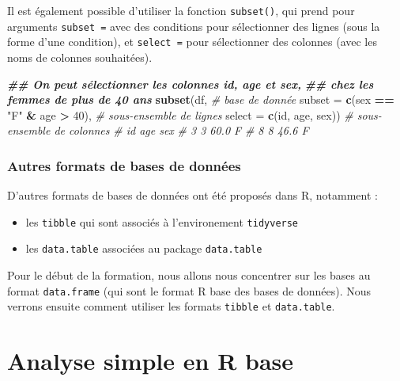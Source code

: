 \documentclass[
]{book}
\newenvironment{Shaded}{\begin{snugshade}}{\end{snugshade}}
\newcommand{\AttributeTok}[1]{\textcolor[rgb]{0.13,0.29,0.53}{#1}}
\newcommand{\CommentTok}[1]{\textcolor[rgb]{0.56,0.35,0.01}{\textit{#1}}}
\newcommand{\DecValTok}[1]{\textcolor[rgb]{0.00,0.00,0.81}{#1}}
\newcommand{\DocumentationTok}[1]{\textcolor[rgb]{0.56,0.35,0.01}{\textbf{\textit{#1}}}}
\newcommand{\FunctionTok}[1]{\textcolor[rgb]{0.13,0.29,0.53}{\textbf{#1}}}
\newcommand{\NormalTok}[1]{#1}
\newcommand{\SpecialCharTok}[1]{\textcolor[rgb]{0.81,0.36,0.00}{\textbf{#1}}}
\newcommand{\StringTok}[1]{\textcolor[rgb]{0.31,0.60,0.02}{#1}}
\providecommand{\tightlist}{%
  \setlength{\itemsep}{0pt}\setlength{\parskip}{0pt}}
\begin{document}
Il est également possible d'utiliser la fonction \texttt{subset()}, qui prend pour arguments \texttt{subset\ =} avec des conditions pour sélectionner des lignes (sous la forme d'une condition), et \texttt{select\ =} pour sélectionner des colonnes (avec les noms de colonnes souhaitées).

\begin{Shaded}
\begin{Highlighting}[]
\DocumentationTok{\#\# On peut sélectionner les colonnes id, age et sex, }
\DocumentationTok{\#\# chez les femmes de plus de 40 ans}
\FunctionTok{subset}\NormalTok{(df, }\CommentTok{\# base de donnée}
       \AttributeTok{subset =} \FunctionTok{c}\NormalTok{(sex }\SpecialCharTok{==} \StringTok{"F"} \SpecialCharTok{\&}\NormalTok{ age }\SpecialCharTok{\textgreater{}} \DecValTok{40}\NormalTok{), }\CommentTok{\# sous{-}ensemble de lignes }
       \AttributeTok{select =} \FunctionTok{c}\NormalTok{(id, age, sex)) }\CommentTok{\# sous{-}ensemble de colonnes}
\CommentTok{\#   id  age sex}
\CommentTok{\# 3  3 60.0   F}
\CommentTok{\# 8  8 46.6   F}
\end{Highlighting}
\end{Shaded}

\subsection{Autres formats de bases de données}\label{autres-formats-de-bases-de-donnuxe9es}

D'autres formats de bases de données ont été proposés dans R, notamment :

\begin{itemize}
\tightlist
\item
  les \texttt{tibble} qui sont associés à l'environement \texttt{tidyverse}
\item
  les \texttt{data.table} associées au package \texttt{data.table}
\end{itemize}

Pour le début de la formation, nous allons nous concentrer sur les bases au format \texttt{data.frame} (qui sont le format R base des bases de données). Nous verrons ensuite comment utiliser les formats \texttt{tibble} et \texttt{data.table}.

\chapter{Analyse simple en R base}\label{analyse-simple-en-r-base}
\end{document}
